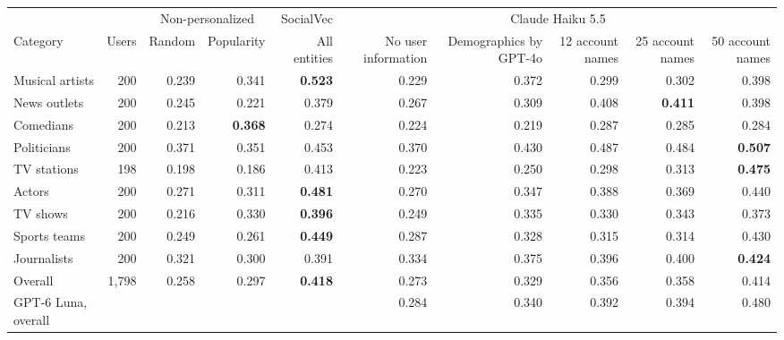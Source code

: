 \begin{tabular}{lrrrrrrrrr}
\toprule
 &  & \multicolumn{2}{c}{Non-personalized} & SocialVec & \multicolumn{5}{c}{Claude Haiku 5.5} \\
Category & Users & Random & Popularity & All entities & No user information & Demographics by GPT-4o & 12 account names & 25 account names & 50 account names \\
\midrule
Musical artists & 200 & 0.239 & 0.341 & \textbf{0.523} & 0.229 & 0.372 & 0.299 & 0.302 & 0.398 \\
News outlets & 200 & 0.245 & 0.221 & 0.379 & 0.267 & 0.309 & 0.408 & \textbf{0.411} & 0.398 \\
Comedians & 200 & 0.213 & \textbf{0.368} & 0.274 & 0.224 & 0.219 & 0.287 & 0.285 & 0.284 \\
Politicians & 200 & 0.371 & 0.351 & 0.453 & 0.370 & 0.430 & 0.487 & 0.484 & \textbf{0.507} \\
TV stations & 198 & 0.198 & 0.186 & 0.413 & 0.223 & 0.250 & 0.298 & 0.313 & \textbf{0.475} \\
Actors & 200 & 0.271 & 0.311 & \textbf{0.481} & 0.270 & 0.347 & 0.388 & 0.369 & 0.440 \\
TV shows & 200 & 0.216 & 0.330 & \textbf{0.396} & 0.249 & 0.335 & 0.330 & 0.343 & 0.373 \\
Sports teams & 200 & 0.249 & 0.261 & \textbf{0.449} & 0.287 & 0.328 & 0.315 & 0.314 & 0.430 \\
Journalists & 200 & 0.321 & 0.300 & 0.391 & 0.334 & 0.375 & 0.396 & 0.400 & \textbf{0.424} \\
\midrule
Overall & 1,798 & 0.258 & 0.297 & \textbf{0.418} & 0.273 & 0.329 & 0.356 & 0.358 & 0.414 \\
GPT-6 Luna, overall &  &  &  &  & 0.284 & 0.340 & 0.392 & 0.394 & 0.480 \\
\bottomrule
\end{tabular}
